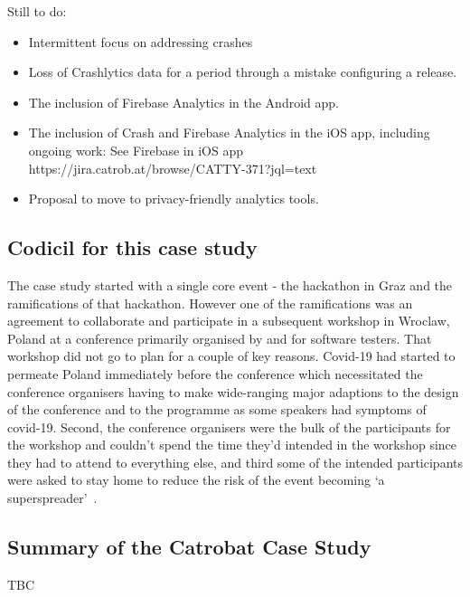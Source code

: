 Still to do:
\begin{itemize}
    \item Intermittent focus on addressing crashes
    \item Loss of Crashlytics data for a period through a mistake configuring a release.
    \item The inclusion of Firebase Analytics in the Android app.
    \item The inclusion of Crash and Firebase Analytics in the iOS app, including ongoing work: See Firebase in iOS app https://jira.catrob.at/browse/CATTY-371?jql=text%
    \item Proposal to move to privacy-friendly analytics tools. 
\end{itemize}



\subsection{Codicil for this case study}
The case study started with a single core event - the hackathon in Graz and the ramifications of that hackathon. However one of the ramifications was an agreement to collaborate and participate in a subsequent workshop in Wroclaw, Poland at a conference primarily organised by and for software testers. That workshop did not go to plan for a couple of key reasons. Covid-19 had started to permeate Poland immediately before the conference which necessitated the conference organisers having to make wide-ranging major adaptions to the design of the conference and to the programme as some speakers had symptoms of covid-19. Second, the conference organisers were the bulk of the participants for the workshop and couldn't spend the time they'd intended in the workshop since they had to attend to everything else, and third some of the intended participants were asked to stay home to reduce the risk of the event becoming `a superspreader'~\citep{cave2020covid}.

\subsection{Summary of the Catrobat Case Study}
TBC
